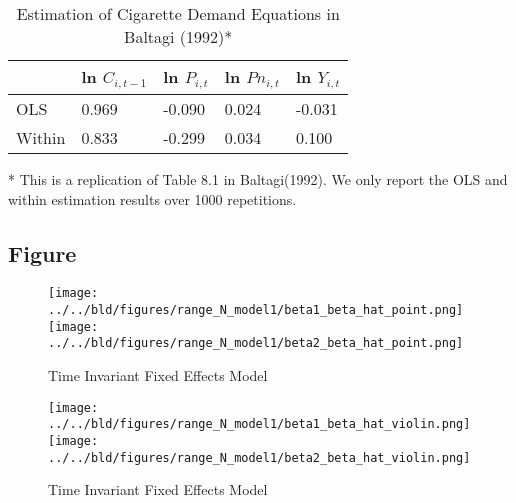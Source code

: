 \documentclass[a4paper]{article}
\begin{document}
\begin{table}[]
\centering
\caption{Estimation of Cigarette Demand Equations in Baltagi (1992)*}
\label{table:table12}

\begin{threeparttable}

\begin{tabular}{lllll}
\hline
       & ln $C_{i,t-1}$ & ln $P_{i,t}$ & ln $Pn_{i,t}$ & ln $Y_{i,t}$ \\ \hline
OLS    & 0.969         & -0.090      & 0.024        & -0.031       \\
Within & 0.833         & -0.299      & 0.034        & 0.100        \\ \hline
\end{tabular}

 \begin{tablenotes}
        \footnotesize
        \item[*] This is a replication of Table 8.1 in Baltagi(1992). We only report the OLS and within estimation results over 1000 repetitions.
      \end{tablenotes}
    \end{threeparttable}

\end{table}


\clearpage

\subsection*{Figure}

\begin{figure}[h]
\centering
\texttt{[image: ../../bld/figures/range\_N\_model1/beta1\_beta\_hat\_point.png]}
\centering
\texttt{[image: ../../bld/figures/range\_N\_model1/beta2\_beta\_hat\_point.png]}
\centering
\caption{Time Invariant Fixed Effects Model}
\label{figure:figure1}
\end{figure}

\clearpage

\begin{figure}[h]
\centering
\texttt{[image: ../../bld/figures/range\_N\_model1/beta1\_beta\_hat\_violin.png]}
\centering
\texttt{[image: ../../bld/figures/range\_N\_model1/beta2\_beta\_hat\_violin.png]}
\centering
\caption{Time Invariant Fixed Effects Model}
\label{figure:figure2}
\end{figure}
\end{document}
